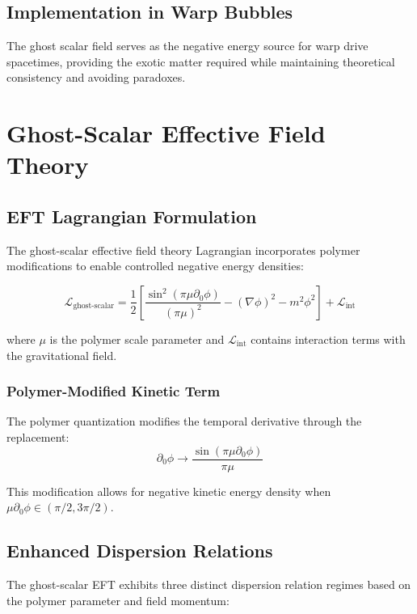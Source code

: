 \subsection{Implementation in Warp Bubbles}

The ghost scalar field serves as the negative energy source for warp drive spacetimes, providing the exotic matter required while maintaining theoretical consistency and avoiding paradoxes.

\section{Ghost-Scalar Effective Field Theory}

\subsection{EFT Lagrangian Formulation}

The ghost-scalar effective field theory Lagrangian incorporates polymer modifications to enable controlled negative energy densities:

\begin{equation}
\mathcal{L}_{\text{ghost-scalar}} = \frac{1}{2}\left[\frac{\sin^2(\pi\mu\partial_0\phi)}{(\pi\mu)^2} - (\nabla\phi)^2 - m^2\phi^2\right] + \mathcal{L}_{\text{int}}
\end{equation}

where $\mu$ is the polymer scale parameter and $\mathcal{L}_{\text{int}}$ contains interaction terms with the gravitational field.

\subsubsection{Polymer-Modified Kinetic Term}

The polymer quantization modifies the temporal derivative through the replacement:
\begin{equation}
\partial_0\phi \rightarrow \frac{\sin(\pi\mu\partial_0\phi)}{\pi\mu}
\end{equation}

This modification allows for negative kinetic energy density when $\mu\partial_0\phi \in (\pi/2, 3\pi/2)$.

\subsection{Enhanced Dispersion Relations}

The ghost-scalar EFT exhibits three distinct dispersion relation regimes based on the polymer parameter and field momentum:

